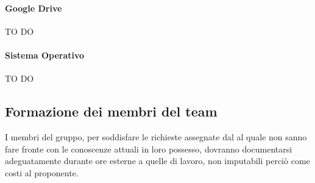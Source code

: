 			\paragraph{Google Drive}
TO DO
			\paragraph{Sistema Operativo}
TO DO





	\subsection{Formazione dei membri del team}
I membri del gruppo, per soddisfare le richieste assegnate dal \roleProjectManager{} al quale non sanno fare fronte con le conoscenze attuali in loro possesso, dovranno documentarsi adeguatamente durante ore esterne a quelle di lavoro, non imputabili perciò come costi al proponente.